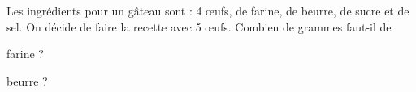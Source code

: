




\hauteurLargeurCadreReponse		{8mm}{2cm}
\initialisationEntrainement

Les ingrédients pour un gâteau sont : 4 œufs,  de farine,  de beurre,  de sucre et  de sel. On décide de faire la recette avec 5 \oe ufs. Combien de grammes faut-il de 

\debutEntrainement


\begin{enonce}
farine ?
\end{enonce}






\begin{enonce}
beurre ?
\end{enonce}

